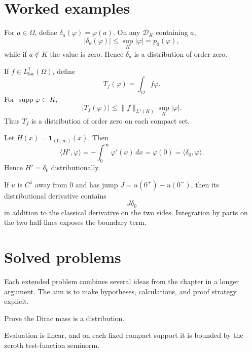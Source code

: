 \section{Worked examples}

\begin{example}\label{ex:iii16-worked-01}
For \(a\in\Omega\), define \(\delta_a(\varphi)=\varphi(a)\). On any
\(\mathcal D_K\) containing \(a\),
\[
|\delta_a(\varphi)|\le \sup_K|\varphi|=p_0(\varphi),
\]
while if \(a\notin K\) the value is zero. Hence \(\delta_a\) is a distribution
of order zero.
\end{example}

\begin{example}\label{ex:iii16-worked-02}
If \(f\in L^1_{\mathrm{loc}}(\Omega)\), define
\[
T_f(\varphi)=\int_\Omega f\varphi.
\]
For \(\operatorname{supp}\varphi\subset K\),
\[
|T_f(\varphi)|\le \|f\|_{L^1(K)}\sup_K|\varphi|.
\]
Thus \(T_f\) is a distribution of order zero on each compact set.
\end{example}

\begin{example}\label{ex:iii16-worked-03}
Let \(H(x)=\mathbf1_{(0,\infty)}(x)\). Then
\[
\langle H',\varphi\rangle
=-\int_0^\infty\varphi'(x)\,dx
=\varphi(0)
=\langle\delta_0,\varphi\rangle.
\]
Hence \(H'=\delta_0\) distributionally.
\end{example}

\begin{example}\label{ex:iii16-worked-04}
If \(u\) is \(C^1\) away from \(0\) and has jump
\(J=u(0^+)-u(0^-)\), then its distributional derivative contains
\[
J\delta_0
\]
in addition to the classical derivative on the two sides. Integration by parts
on the two half-lines exposes the boundary term.
\end{example}

\section{Solved problems}
Each extended problem combines several ideas from the chapter in a longer argument. The aim is to make hypotheses, calculations, and proof strategy explicit.

\begin{problem}\label{prob:iii16-problem-01}
Prove the Dirac mass is a distribution.
\end{problem}
\begin{solution}
Evaluation is linear, and on each fixed compact support it is bounded by
the zeroth test-function seminorm.
\end{solution}


